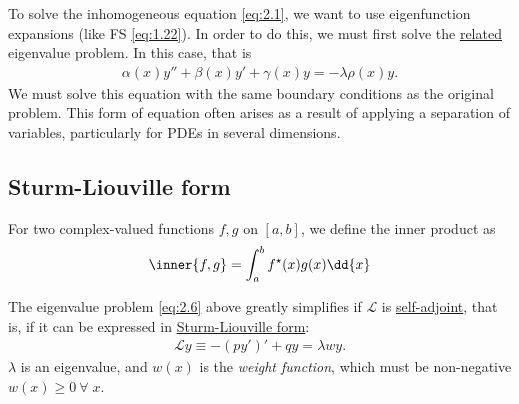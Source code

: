 To solve the inhomogeneous equation \cref{eq:2.1}, we want to use eigenfunction expansions (like FS \cref{eq:1.22}).
In order to do this, we must first solve the \underline{related} eigenvalue problem.
In this case, that is
\begin{align}
    \alpha(x) y'' + \beta(x) y' + \gamma(x) y = -\lambda \rho(x) y. \label{eq:2.6}
\end{align}
We must solve this equation with the same boundary conditions as the original problem.
This form of equation often arises as a result of applying a separation of variables, particularly for PDEs in several dimensions.

\subsection{Sturm-Liouville form}
\begin{definition}
    For two complex-valued functions $f, g$ on $[a,b]$, we define the inner product as
    \begin{align*}
        \inner{f,g} = \int_a^b f^\star(x) g(x) \dd{x}
    \end{align*} 
\end{definition} 
The eigenvalue problem \cref{eq:2.6} above greatly simplifies if $\mathcal L$ is \underline{self-adjoint}, that is, if it can be expressed in \underline{Sturm-Liouville form}:
\begin{align} \label{eq:2.7}
    \mathcal L y \equiv -(py')' + qy = \lambda w y.
\end{align}
$\lambda$ is an eigenvalue, and $w(x)$ is the \textit{weight function}, which must be non-negative $w(x) \geq 0 \ \forall \; x$.

